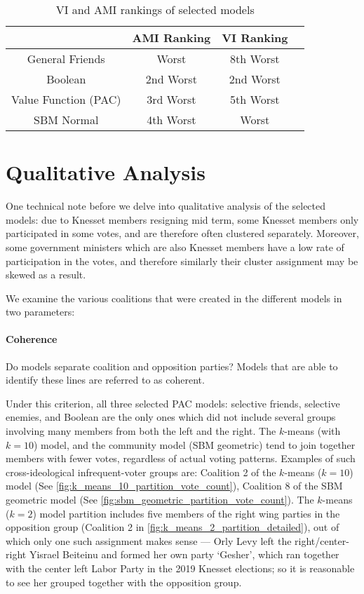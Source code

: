 \begin{table}[ht]
\centering
\begin{tabular}{|c|c|c|c|}
\hline
       & AMI Ranking & VI Ranking \\ \hline
General Friends & Worst & 8th Worst \\
Boolean & 2nd Worst & 2nd Worst \\
Value Function (PAC) & 3rd Worst & 5th Worst \\
SBM Normal & 4th Worst & Worst \\
\hline
\end{tabular}
\caption{VI and AMI rankings of selected models}
\label{Analysis:table:ami_vi_worst_rankings}
\end{table}


\section{Qualitative Analysis}
\label{sec:qualitative_analysis}

One technical note before we delve into qualitative analysis of the selected
models: due to Knesset members resigning mid term, some Knesset members only participated in some votes, and are therefore often clustered separately.
Moreover, some government ministers which are also Knesset members have a low
rate of participation in the votes, and therefore similarly their cluster
assignment may be skewed as a result.

We examine the various coalitions that were created in the different models in two parameters:

\paragraph{Coherence}
Do models separate coalition and opposition parties? Models that are able to identify these lines are referred to as coherent.

Under this criterion, all three selected PAC models: selective friends,
selective enemies, and Boolean are the only ones which did not include several
groups involving many members from both the left and the right.
The $k$-means (with $k=10$) model, and the community model (SBM geometric) tend to
join together members with fewer votes, regardless of actual voting patterns.
Examples of such cross-ideological infrequent-voter groups are: Coalition 2
of the $k$-means ($k=10$) model (See \autoref{fig:k_means_10_partition_vote_count}),
Coalition 8 of the SBM geometric model (See
\autoref{fig:sbm_geometric_partition_vote_count}).
The $k$-means ($k=2$) model partition includes five members of the right wing
parties in the opposition group (Coalition 2 in
\autoref{fig:k_means_2_partition_detailed}), out of which only one such
assignment makes sense --- Orly Levy left the right/center-right Yisrael
Beiteinu and formed her own party `Gesher', which ran together with the center
left Labor Party in the 2019 Knesset elections\cite{knesset:levy, wiki:levy};
so it is reasonable to see her grouped together with the opposition group.

